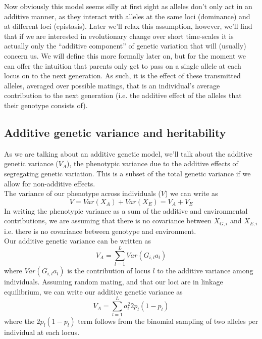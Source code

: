 Now obviously this model seems silly at first sight as alleles don't only act in an additive manner, as they interact with alleles at the same loci (dominance) and at different loci (epistasis). Later we'll relax this assumption, 
however, we'll find that if we are interested in evolutionary change over short time-scales it is actually only the ``additive
component'' of genetic variation that will (usually) concern us. 
We will define this more formally later on, but for the moment 
we can offer the intuition that parents only get to pass on a single allele at each locus on to the next generation. As such, it is the effect of these transmitted alleles, averaged over possible matings, that is an individual's average contribution  to the next generation (i.e. the additive effect of the alleles that their genotype consists of).



\subsection{Additive genetic variance and heritability}
As we are talking about an additive genetic model, we'll talk about the additive genetic variance ($V_A$), the phenotypic variance due to the additive effects of segregating genetic variation. This is a subset of the total genetic
variance if we allow for non-additive effects. \\

The variance of our phenotype across individuals ($V$) we can write as
\begin{equation}
V = Var(X_A) + Var(X_E) = V_A+V_E
\end{equation}
In writing the phenotypic variance as a sum of the additive and
environmental contributions, we are assuming that there is no
covariance between $X_{G,i}$ and $X_{E,i}$ i.e. there is no covariance
between genotype and environment.  \\

Our additive genetic variance can be written as
\begin{equation}
V_A = \sum_{l=1}^L Var(G_{i,l} a_{l})
\end{equation}
where $Var(G_{i,l} a_{l})$ is the contribution of locus $l$ to the additive
variance among individuals. Assuming random mating, and that our loci are in linkage equilibrium, we can write our additive genetic variance as
\begin{equation}
V_A = \sum_{l=1}^L a_{l}^2 2 p_l(1-p_l)  \label{eqn:VA}
\end{equation}
where the $ 2 p_l(1-p_l)$ term follows from the binomial sampling of
two alleles per individual at each locus. \\

